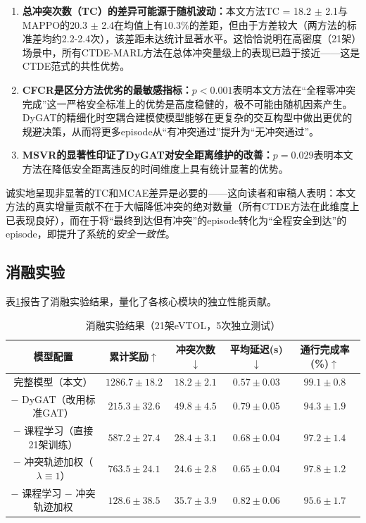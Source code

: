 \documentclass[12pt,a4paper,UTF8]{ctexart}
\begin{document}
\begin{enumerate}[label=(\arabic*)]
    \item \textbf{总冲突次数（TC）的差异可能源于随机波动：}本文方法TC = 18.2 $\pm$ 2.1与MAPPO的20.3 $\pm$ 2.4在均值上有10.3\%的差距，但由于方差较大（两方法的标准差均约2.2-2.4次），该差距未达统计显著水平。这恰恰说明在高密度（21架）场景中，所有CTDE-MARL方法在总体冲突量级上的表现已趋于接近——这是CTDE范式的共性优势。
    \item \textbf{CFCR是区分方法优劣的最敏感指标：}$p<0.001$表明本文方法在``全程零冲突完成''这一严格安全标准上的优势是高度稳健的，极不可能由随机因素产生。DyGAT的精细化时空耦合建模使模型能够在更复杂的交互构型中做出更优的规避决策，从而将更多episode从``有冲突通过''提升为``无冲突通过''。
    \item \textbf{MSVR的显著性印证了DyGAT对安全距离维护的改善：}$p=0.029$表明本文方法在降低安全距离违反的时间维度上具有统计显著的优势。
\end{enumerate}

诚实地呈现非显著的TC和MCAE差异是必要的——这向读者和审稿人表明：本文方法的真实增量贡献不在于大幅降低冲突的绝对数量（所有CTDE方法在此维度上已表现良好），而在于将``最终到达但有冲突''的episode转化为``全程安全到达''的episode，即提升了系统的\emph{安全一致性}。

\subsection{消融实验}

表\ref{tab:ablation}报告了消融实验结果，量化了各核心模块的独立性能贡献。

\begin{table}[H]
    \centering
    \caption{消融实验结果（21架eVTOL，5次独立测试）}
    \label{tab:ablation}
    \begin{tabular}{|c|c|c|c|c|}
        \hline
        \textbf{模型配置} & \textbf{累计奖励$\uparrow$} & \textbf{冲突次数$\downarrow$} & \textbf{平均延迟(s)$\downarrow$} & \textbf{通行完成率(\%)$\uparrow$} \\
        \hline
        完整模型（本文） & $\mathbf{1286.7 \pm 18.2}$ & $\mathbf{18.2 \pm 2.1}$ & $\mathbf{0.57 \pm 0.03}$ & $\mathbf{99.1 \pm 0.8}$ \\
        $-$ DyGAT（改用标准GAT） & $215.3 \pm 32.6$ & $49.8 \pm 4.5$ & $0.79 \pm 0.05$ & $94.3 \pm 1.9$ \\
        $-$ 课程学习（直接21架训练） & $587.2 \pm 27.4$ & $28.4 \pm 3.1$ & $0.68 \pm 0.04$ & $97.2 \pm 1.4$ \\
        $-$ 冲突轨迹加权（$\lambda\equiv1$） & $763.5 \pm 24.1$ & $24.6 \pm 2.8$ & $0.65 \pm 0.04$ & $97.8 \pm 1.2$ \\
        $-$ 课程学习 $-$ 冲突轨迹加权 & $128.6 \pm 38.5$ & $35.7 \pm 3.9$ & $0.82 \pm 0.06$ & $95.6 \pm 1.7$ \\
        \hline
    \end{tabular}
\end{table}
\end{document}
